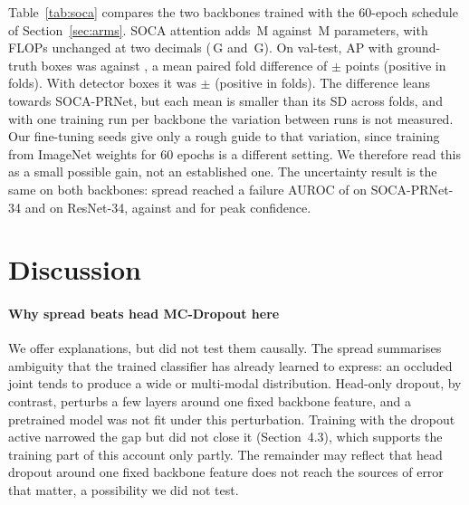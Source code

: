 \documentclass[preprint,11pt]{elsarticle}
\begin{document}
Table~\ref{tab:soca} compares the two backbones trained with the 60-epoch schedule of
Section~\ref{sec:arms}. SOCA attention adds \ParamsSocaBase{}\,M against \ParamsRThreeFourBase{}\,M
parameters, with FLOPs unchanged at two decimals (\FlopsSocaBase{}\,G and \FlopsRThreeFourBase{}\,G). On
val-test, AP with ground-truth boxes was \ApTestGtImSocaBaseSZero{} against \ApTestGtImRThreeFourBaseSZero{},
a mean paired fold difference of \DapGtImSocaBaseSZero{} $\pm$ \DapSdGtImSocaBaseSZero{} points (positive in
\DapPosGtImSocaBaseSZero{} folds). With detector boxes it was \DapDetImSocaBaseSZero{} $\pm$
\DapSdDetImSocaBaseSZero{} (positive in \DapPosDetImSocaBaseSZero{} folds). The difference leans towards
SOCA-PRNet, but each mean is smaller than its SD across folds, and with one training run per backbone the
variation between runs is not measured. Our fine-tuning seeds give only a rough guide to that variation,
since training from ImageNet weights for 60 epochs is a different setting. We therefore read this as a
small possible gain, not an established one. The uncertainty result is the same on both backbones: spread
reached a failure AUROC of \FaImSocaBaseSZeroDist{} on SOCA-PRNet-34 and \FaImRThreeFourBaseSZeroDist{} on
ResNet-34, against \FaImSocaBaseSZeroConf{} and \FaImRThreeFourBaseSZeroConf{} for peak confidence.

\begin{table}[t]
\centering\small
\caption{ResNet-34 and SOCA-PRNet-34 with the same SimCC head, trained from ImageNet weights for 60
epochs, one run each. AP is on val-test images. The shortened schedule means these values cannot be
compared with published 210-epoch results.}
\label{tab:soca}
\end{table}

\section{Discussion}

\paragraph{Why spread beats head MC-Dropout here} We offer explanations, but did not test them
causally. The spread summarises ambiguity that the trained classifier has already learned to express:
an occluded joint tends to produce a wide or multi-modal distribution. Head-only dropout, by contrast,
perturbs a few layers around one fixed backbone feature, and a pretrained model was not fit under this
perturbation. Training with the dropout active narrowed the gap but did not close it
(Section~4.3), which supports the training part of this account only partly. The remainder may reflect
that head dropout around one fixed backbone feature does not reach the sources of error that matter,
a possibility we did not test.
\end{document}
